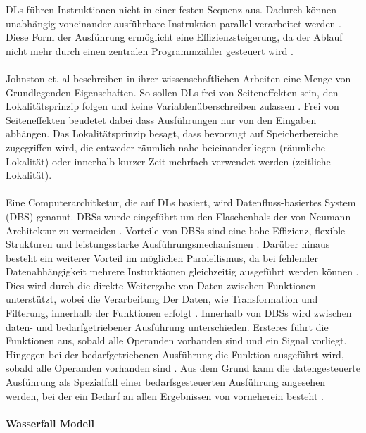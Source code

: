\documentclass{article}
\begin{document}
    DLs führen Instruktionen nicht in einer festen Sequenz aus. Dadurch können unabhängig voneinander ausführbare Instruktion parallel verarbeitet werden \cite{1}.
    Diese Form der Ausführung ermöglicht eine Effizienzsteigerung, da der Ablauf nicht mehr durch einen zentralen Programmzähler gesteuert wird \cite{2}.\\
    \\
    Johnston et. al beschreiben in ihrer wissenschaftlichen Arbeiten eine Menge von Grundlegenden Eigenschaften. 
    So sollen DLs frei von Seiteneffekten sein, den Lokalitätsprinzip folgen und keine Variablenüberschreiben zulassen \cite{2}.
    Frei von Seiteneffekten beudetet dabei dass Ausführungen nur von den Eingaben abhängen.
    Das Lokalitätsprinzip besagt, dass bevorzugt auf Speicherbereiche zugegriffen wird, die entweder räumlich nahe beieinanderliegen (räumliche Lokalität) oder innerhalb kurzer Zeit mehrfach verwendet werden (zeitliche Lokalität).\\
    \\
    Eine Computerarchitketur, die auf DLs basiert, wird Datenfluss-basiertes System (DBS) genannt.
    DBSs wurde eingeführt um den Flaschenhals der von-Neumann-Architektur zu vermeiden \cite{8}. %
    Vorteile von DBSs sind eine hohe Effizienz, flexible Strukturen und leistungsstarke Ausführungsmechanismen \cite{1}.
    Darüber hinaus besteht ein weiterer Vorteil im möglichen Paralellismus, da bei fehlender Datenabhängigkeit mehrere Insturktionen gleichzeitig ausgeführt werden können \cite{1}.
    Dies wird durch die direkte Weitergabe von Daten zwischen Funktionen unterstützt, wobei die Verarbeitung Der Daten, wie Transformation und Filterung, innerhalb der Funktionen erfolgt \cite{15}.
    Innerhalb von DBSs wird zwischen daten- und bedarfgetriebener Ausführung unterschieden. 
    Ersteres führt die Funktionen aus, sobald alle Operanden vorhanden sind und ein Signal vorliegt. 
    Hingegen bei der bedarfgetriebenen Ausführung die Funktion ausgeführt wird, sobald alle Operanden vorhanden sind \cite{2}.
    Aus dem Grund kann die datengesteuerte Ausführung als Spezialfall einer bedarfsgesteuerten Ausführung angesehen werden, bei der ein Bedarf an allen Ergebnissen von vorneherein besteht \cite{11}.\\
    \\
    \textbf{Wasserfall Modell}\\
\end{document}
